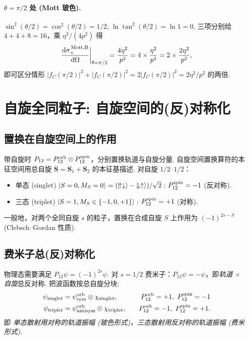 \paragraph{$\theta=\pi/2$ 处 (Mott 玻色).}\quad $\sin^2(\theta/2)=\cos^2(\theta/2)=1/2$, $\ln\tan^2(\theta/2)=\ln 1=0$, 三项分别给 $4+4+8=16$，乘 $\eta^2/(4p^2)$ 得
\begin{equation}
  \frac{\mathrm{d}\sigma_+^{\,\rm Mott,B}}{\mathrm{d}\Omega}\bigg|_{\theta=\pi/2}
  =\frac{4\eta^2}{p^2}=4\times\frac{\eta^2}{p^2}=2\times\frac{2\eta^2}{p^2},
\end{equation}
即可区分情形 $|f_C(\pi/2)|^2+|f_C(\pi/2)|^2=2|f_C(\pi/2)|^2=2\eta^2/p^2$ 的两倍.

\section{自旋全同粒子: 自旋空间的(反)对称化}\label{sec:id-spin}

\subsection{置换在自旋空间上的作用}\label{sec:id-perm-spin}

带自旋时 $P_{12}=P_{12}^{\rm orb}\otimes P_{12}^{\rm spin}$，分别置换轨道与自旋分量. 自旋空间置换算符的本征空间用总自旋 $\bm S=\bm S_1+\bm S_2$ 的本征基描述. 对自旋 $1/2$--$1/2$：
\begin{itemize}
  \item 单态 (singlet) $\ket{S=0,M_S=0}=(\ket{\!\uparrow\downarrow}-\ket{\!\downarrow\uparrow})/\sqrt 2$\,: $P_{12}^{\rm spin}=-1$ (反对称).
  \item 三态 (triplet) $\ket{S=1,M_S\in\{-1,0,+1\}}$\,: $P_{12}^{\rm spin}=+1$ (对称).
\end{itemize}
一般地，对两个全同自旋 $s$ 的粒子，置换在合成自旋 $S$ 上作用为 $(-1)^{2s-S}$ (Clebsch--Gordan 性质).

\subsection{费米子总(反)对称化}\label{sec:id-fermi-decomp}

物理态需要满足 $P_{12}\psi=(-1)^{2s}\psi$. 对 $s=1/2$ 费米子：$P_{12}\psi=-\psi$，即\emph{轨道 $\times$ 自旋}总反对称. 把波函数按总自旋分块:
\begin{align}
  \psi_{\rm singlet}&=\psi^{\rm orb}_{\rm sym}\otimes\chi_{\rm singlet},\quad &P_{12}^{\rm orb}=+1,\ P_{12}^{\rm spin}=-1\nonumber\\
  \psi_{\rm triplet}&=\psi^{\rm orb}_{\rm antisym}\otimes\chi_{\rm triplet},\quad &P_{12}^{\rm orb}=-1,\ P_{12}^{\rm spin}=+1.
  \label{eq:id-singtrip-decomp}
\end{align}
即 \emph{单态散射用对称的轨道振幅 (玻色形式)，三态散射用反对称的轨道振幅 (费米形式)}.

